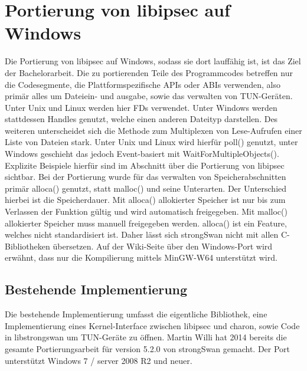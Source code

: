 


\section{Portierung von libipsec auf Windows}
Die Portierung von libipsec auf Windows, sodass sie dort lauffähig ist, ist das Ziel
der Bachelorarbeit. Die zu portierenden Teile des Programmcodes betreffen nur
die Codesegmente, die Plattformspezifische \acp{API} oder \acp{ABI} verwenden,
also primär alles um Dateiein- und ausgabe, sowie das verwalten von TUN-Geräten.
Unter Unix und Linux werden hier \acp{FD} verwendet. Unter Windows werden stattdessen
Handles genutzt, welche einen anderen Dateityp darstellen. Des weiteren unterscheidet
sich die Methode zum Multiplexen von Lese-Aufrufen einer Liste von Dateien stark.
Unter Unix und Linux wird hierfür poll() genutzt, unter Windows geschieht das jedoch
Event-basiert mit WaitForMultipleObjects().
Explizite Beispiele hierfür sind im Abschnitt über die Portierung von libipsec sichtbar.
Bei der Portierung wurde für das verwalten von Speicherabschnitten 
primär alloca() genutzt, statt malloc() und seine Unterarten. Der Unterschied hierbei ist die
Speicherdauer. Mit alloca() allokierter Speicher ist nur bis zum Verlassen der Funktion gültig
und wird automatisch freigegeben. Mit malloc() allokierter Speicher muss manuell freigegeben werden.
alloca() ist ein Feature, welches nicht standardisiert ist.
Daher lässt sich strongSwan nicht mit allen C-Bibliotheken übersetzen.
Auf der Wiki-Seite über den Windows-Port wird erwähnt, dass nur die Kompilierung
mittels MinGW-W64 unterstützt wird.


\subsection{Bestehende Implementierung}
Die bestehende Implementierung umfasst die eigentliche Bibliothek, eine Implementierung
eines Kernel-Interface zwischen libipsec und charon, sowie Code in libstrongswan
um TUN-Geräte zu öffnen. Martin Willi hat 2014 bereits die gesamte Portierungsarbeit
für version 5.2.0 von strongSwan gemacht. Der Port unterstützt Windows 7 / server 2008 R2
und neuer.

